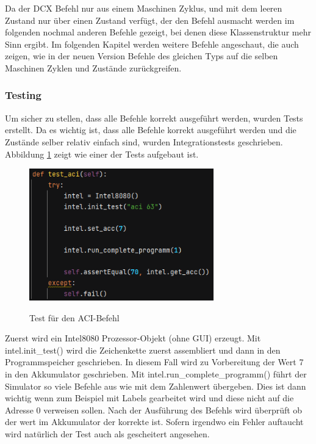\documentclass[12pt]{article}
\newcommand{\imgSpaceBefore}{\\[0.2cm]}
\begin{document}
\noindent
Da der DCX Befehl nur aus einem Maschinen Zyklus, und mit dem leeren Zustand nur über einen Zustand verfügt, der den Befehl ausmacht werden im folgenden nochmal anderen Befehle gezeigt, bei denen diese Klassenstruktur mehr Sinn ergibt. Im folgenden Kapitel werden weitere Befehle angeschaut, die auch zeigen, wie in der neuen Version Befehle des gleichen Typs auf die selben Maschinen Zyklen und Zustände zurückgreifen.

\subsubsection{Testing}
Um sicher zu stellen, dass alle Befehle korrekt ausgeführt werden, wurden Tests erstellt. 
Da es wichtig ist, dass alle Befehle korrekt ausgeführt werden und die Zustände selber relativ einfach sind, wurden Integrationstests geschrieben. Abbildung \ref{fig:test_aci} zeigt wie einer der Tests aufgebaut ist. 
\imgSpaceBefore
\begin{figure}[H]
\caption{Test für den ACI-Befehl}
\centering
\includegraphics[width=8cm]{bilder/test_aci}
\label{fig:test_aci}
\end{figure}

\noindent
Zuerst wird ein Intel8080 Prozessor-Objekt (ohne GUI) erzeugt. Mit intel.init\_test() wird die Zeichenkette zuerst assembliert und dann in den Programmspeicher geschrieben. In diesem Fall wird zu Vorbereitung der Wert 7 in den Akkumulator geschrieben. Mit intel.run\_complete\_programm() führt der Simulator so viele Befehle aus wie mit dem Zahlenwert übergeben. Dies ist dann wichtig wenn zum Beispiel mit Labels gearbeitet wird und diese nicht auf die Adresse 0 verweisen sollen. Nach der Ausführung des Befehls wird überprüft ob der wert im Akkumulator der korrekte ist. Sofern irgendwo ein Fehler auftaucht wird natürlich der Test auch als gescheitert angesehen.
\\
\end{document}

